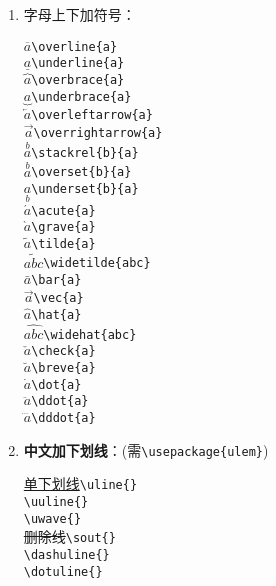 \documentclass{article}
\newcommand{\q}{\quad}
\begin{document}
\begin{multicols}{2}
\begin{enumerate}
\item 字母上下加符号：
\vspace{-4mm}
\begin{multicols}{2}
$ \overline{a} $\q \verb|\overline{a}| \\
$ \underline{a} $\q \verb|\underline{a}| \\
$ \overbrace{a} $\q \verb|\overbrace{a}| \\
$ \underbrace{a} $\q \verb|\underbrace{a}| \\
$ \overleftarrow{a} $\q \verb|\overleftarrow{a}| \\
$ \overrightarrow{a} $\q \verb|\overrightarrow{a}| \\
$ \stackrel{b}{a} $\q \verb|\stackrel{b}{a}| \\
$ \overset{b}{a} $\q \verb|\overset{b}{a}| \\
$ \underset{b}{a} $\q \verb|\underset{b}{a}| \\
$ \acute{a} $\q \verb|\acute{a}| \\
$ \grave{a} $\q \verb|\grave{a}| \\
$ \tilde{a} $\q \verb|\tilde{a}| \\
$ \widetilde{abc} $\q \verb|\widetilde{abc}| \\
$ \bar{a} $\q \verb|\bar{a}| \\
$ \vec{a} $\q \verb|\vec{a}| \\
$ \hat{a} $\q \verb|\hat{a}| \\
$ \widehat{abc} $\q \verb|\widehat{abc}| \\
$ \check{a} $\q \verb|\check{a}| \\
$ \breve{a} $\q \verb|\breve{a}| \\
$ \dot{a} $\q \verb|\dot{a}| \\
$ \ddot{a} $\q \verb|\ddot{a}| \\
$ \dddot{a} $\q \verb|\dddot{a}| 
\end{multicols}
\vspace{-4mm}

\item \textbf{中文加下划线}：(需\verb|\usepackage{ulem}|)
\vspace{-5mm}
\begin{multicols}{2}
\uline{单下划线}\q \verb|\uline{}| \\
\q \verb|\uuline{}| \\
\q\q \verb|\uwave{}| \\
\sout{删除线}\q\q \verb|\sout{}| \\
\q \verb|\dashuline{}| \\
\q \verb|\dotuline{}| 
\end{multicols}


\end{enumerate}
\end{multicols}
\end{document}
